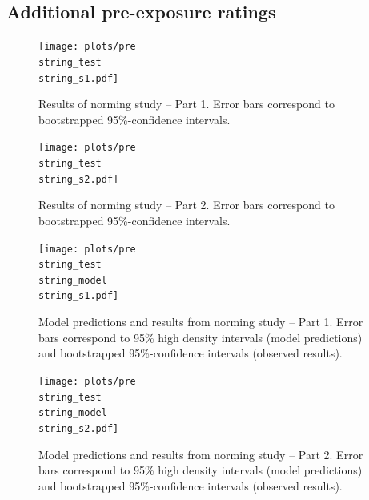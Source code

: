 \documentclass[lucida,biblatex]{sp} %
\begin{document}
\subsection*{Additional pre-exposure ratings}

\begin{figure}
\texttt{[image: plots/pre\\string\_test\\string\_s1.pdf]}
\caption{Results of norming study -- Part 1. Error bars correspond to bootstrapped 95\%-confidence intervals. \label{fig:norming-results-1}}
\end{figure}

\begin{figure}
\texttt{[image: plots/pre\\string\_test\\string\_s2.pdf]}
\caption{Results of norming study -- Part 2. Error bars correspond to bootstrapped 95\%-confidence intervals. \label{fig:norming-results-2}}

\end{figure}

\begin{figure}
\texttt{[image: plots/pre\\string\_test\\string\_model\\string\_s1.pdf]}
\caption{Model predictions and results from norming study -- Part 1. Error bars correspond to 95\% high density intervals (model predictions) and bootstrapped 95\%-confidence intervals (observed results). \label{fig:norming-results-model-1}}

\end{figure}

\begin{figure}
\texttt{[image: plots/pre\\string\_test\\string\_model\\string\_s2.pdf]}
\caption{Model predictions and results from norming study -- Part 2. Error bars correspond to 95\% high density intervals (model predictions) and bootstrapped 95\%-confidence intervals (observed results). \label{fig:norming-results-model-2}}

\end{figure}
\end{document}
